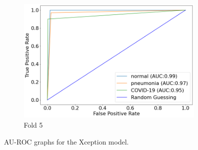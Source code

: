 \begin{figure}
     \vspace{10mm} %
     \begin{subfigure}[b]{0.49\textwidth}
         \centering
         \includegraphics[width=\textwidth]{figures/au-roc-5.png}
         \caption{Fold 5}
         \label{fig:auroc-fold-5}
     \end{subfigure}
        \caption{AU-ROC graphs for the Xception model.}
        \label{fig:au-roc-all}
\end{figure}
